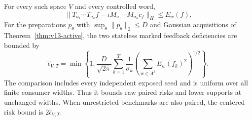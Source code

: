 \begin{theorem}
\label{thm:v14-residual}
For every such space $V$ and every controlled word,
\begin{equation}\label{eq:v14-wordbound}
 \|T_{a_1}\cdots T_{a_k}f
      -\iota M_{a_1}\cdots M_{a_k}c_f\|_H\le E_w(f).
\end{equation}
For the preparations $p_\theta$ with $\sup_\theta\|p_\theta\|_2\le D$
and Gaussian acquisitions of Theorem~\ref{thm:v13-active}, the two
stateless marked feedback deficiencies are bounded by
\begin{equation}\label{eq:v14-physical-certificate}
 \widehat\epsilon_{V,T}
 =\min\left\{1,\frac{D}{\sqrt{2\pi}}
       \sum_{k=1}^T\frac{1}{\sigma_k}
          \left(\sum_{w\in A^k}E_w(f_k)^2\right)^{1/2}\right\}.
\end{equation}
The comparison includes every independent exposed seed and is uniform
over all finite consumer widths. Thus it bounds raw paired risks and
lower supports at unchanged widths. When unrestricted benchmarks are
also paired, the centered risk bound is $2\widehat\epsilon_{V,T}$.
\end{theorem}
